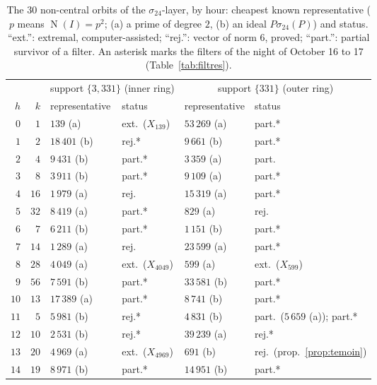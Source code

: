\documentclass[11pt,a4paper]{amsart}
\theoremstyle{plain}
\theoremstyle{definition}
\DeclareMathOperator{\Nm}{N}
\begin{document}
\begin{table}[ht]
\caption{The $30$ non-central orbits of the $\sigma_{24}$-layer, by hour: cheapest known representative ($p$ means $\Nm(I)=p^2$; (a) a prime of degree $2$, (b) an ideal $P\sigma_{24}(P)$) and status. ``ext.'': extremal, computer-assisted; ``rej.'': vector of norm $6$, proved; ``part.'': partial survivor of a filter. An asterisk marks the filters of the night of October 16 to 17 (Table~\ref{tab:filtres}).}\label{tab:census}
\centering\small\setlength{\tabcolsep}{5pt}
\begin{tabular}{rr ll ll}
\toprule
& & \multicolumn{2}{c}{support $\{3,331\}$ (inner ring)} & \multicolumn{2}{c}{support $\{331\}$ (outer ring)} \\
\cmidrule(lr){3-4}\cmidrule(lr){5-6}
$h$ & $k$ & representative & status & representative & status \\
\midrule
$0$ & $1$ & $139$ (a) & ext.\ ($X_{139}$) & $53\,269$ (a) & part.* \\
$1$ & $2$ & $18\,401$ (b) & rej.* & $9\,661$ (b) & part.* \\
$2$ & $4$ & $9\,431$ (b) & part.* & $3\,359$ (a) & part. \\
$3$ & $8$ & $3\,911$ (b) & part.* & $9\,109$ (a) & part.* \\
$4$ & $16$ & $1\,979$ (a) & rej. & $15\,319$ (a) & part.* \\
$5$ & $32$ & $8\,419$ (a) & part.* & $829$ (a) & rej. \\
$6$ & $7$ & $6\,211$ (b) & part.* & $1\,151$ (b) & part.* \\
$7$ & $14$ & $1\,289$ (a) & rej. & $23\,599$ (a) & part.* \\
$8$ & $28$ & $4\,049$ (a) & ext.\ ($X_{4049}$) & $599$ (a) & ext.\ ($X_{599}$) \\
$9$ & $56$ & $7\,591$ (b) & part.* & $33\,581$ (b) & part.* \\
$10$ & $13$ & $17\,389$ (a) & part.* & $8\,741$ (b) & part.* \\
$11$ & $5$ & $5\,981$ (b) & rej.* & $4\,831$ (b) & part.\ ($5\,659$ (a)); part.* \\
$12$ & $10$ & $2\,531$ (b) & rej.* & $39\,239$ (a) & rej.* \\
$13$ & $20$ & $4\,969$ (a) & ext.\ ($X_{4969}$) & $691$ (b) & rej.\ (prop.~\ref{prop:temoin}) \\
$14$ & $19$ & $8\,971$ (b) & part.* & $14\,951$ (b) & part.* \\
\bottomrule
\end{tabular}
\end{table}
\end{document}
